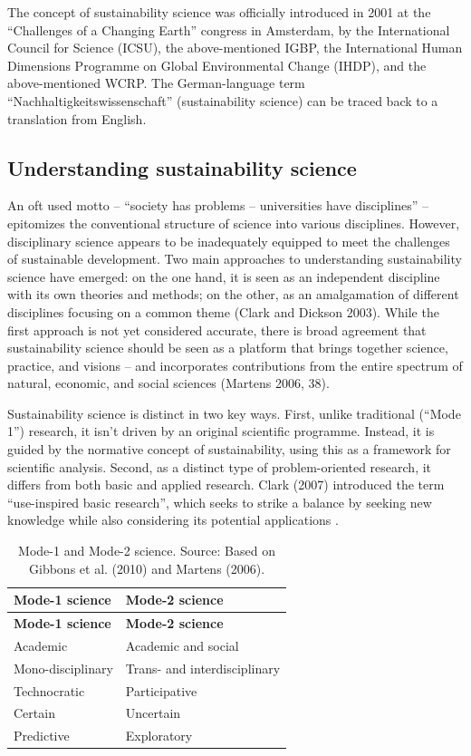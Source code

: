\documentclass[
  a4paper,
  openany]{book}
\begin{document}
The concept of sustainability science was officially introduced in 2001
at the ``Challenges of a Changing Earth'' congress in Amsterdam, by the
International Council for Science (ICSU), the above-mentioned IGBP, the
International Human Dimensions Programme on Global Environmental Change
(IHDP), and the above-mentioned WCRP. The German-language term
``Nachhaltigkeitswissenschaft'' (sustainability science) can be traced
back to a translation from English.

\subsection{Understanding sustainability
science}\label{understanding-sustainability-science}

An oft used motto -- ``society has problems -- universities have
disciplines'' -- epitomizes the conventional structure of science into
various disciplines. However, disciplinary science appears to be
inadequately equipped to meet the challenges of sustainable development.
Two main approaches to understanding sustainability science have
emerged: on the one hand, it is seen as an independent discipline with
its own theories and methods; on the other, as an amalgamation of
different disciplines focusing on a common theme (Clark and Dickson
2003). While the first approach is not yet considered accurate, there is
broad agreement that sustainability science should be seen as a platform
that brings together science, practice, and visions -- and incorporates
contributions from the entire spectrum of natural, economic, and social
sciences (Martens 2006, 38).

Sustainability science is distinct in two key ways. First, unlike
traditional (``Mode 1'') research, it isn't driven by an original
scientific programme. Instead, it is guided by the normative concept of
sustainability, using this as a framework for scientific analysis.
Second, as a distinct type of problem-oriented research, it differs from
both basic and applied research. Clark (2007) introduced the term
``use-inspired basic research'', which seeks to strike a balance by
seeking new knowledge while also considering its potential applications
.

\begin{longtable}[]{@{}ll@{}}
\caption{Mode-1 and Mode-2 science. Source: Based on Gibbons et al.
(2010) and Martens (2006).}\label{tbl-modes-science}\tabularnewline
\toprule\noalign{}
\textbf{Mode-1 science} & \textbf{Mode-2 science} \\
\midrule\noalign{}
\endfirsthead
\toprule\noalign{}
\textbf{Mode-1 science} & \textbf{Mode-2 science} \\
\midrule\noalign{}
\endhead
\bottomrule\noalign{}
\endlastfoot
Academic & Academic and social \\
Mono-disciplinary & Trans- and interdisciplinary \\
Technocratic & Participative \\
Certain & Uncertain \\
Predictive & Exploratory \\
\end{longtable}
\end{document}
